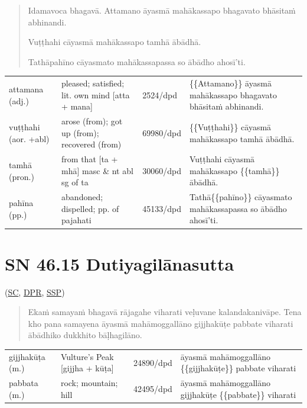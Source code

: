 \documentclass[11pt,oneside]{memoir}
\begin{document}
\clearpage
\casesLegendHeaderBGHere

\begin{quote}
Idamavoca bhagavā. Attamano āyasmā mahākassapo bhagavato bhāsitaṁ abhinandi.

Vuṭṭhahi cāyasmā mahākassapo tamhā ābādhā.

Tathāpahīno cāyasmato mahākassapassa so ābādho ahosī'ti.
\end{quote}

\begin{longtable}{L{\colOne} L{\colTwo} H H}
attamana (adj.) & pleased; satisfied; lit. own mind [atta + mana] & 2524/dpd & \{\{Attamano\}\} āyasmā mahākassapo bhagavato bhāsitaṁ abhinandi.\\[0pt]
vuṭṭhahi (aor. +abl) & arose (from); got up (from); recovered (from) & 69980/dpd & \{\{Vuṭṭhahi\}\} cāyasmā mahākassapo tamhā ābādhā.\\[0pt]
tamhā (pron.) & from that [ta + mhā] masc \& nt abl sg of ta & 30060/dpd & Vuṭṭhahi cāyasmā mahākassapo \{\{tamhā\}\} ābādhā.\\[0pt]
pahīna (pp.) & abandoned; dispelled; pp. of pajahati & 45133/dpd & Tathā\{\{pahīno\}\} cāyasmato mahākassapassa so ābādho ahosī'ti.\\[0pt]
\end{longtable}

\section{SN 46.15 Dutiyagilānasutta}
\label{sec:orgc38f146}

(\href{https://suttacentral.net/sn46.15/pli/ms}{SC}, \href{https://www.digitalpalireader.online/\_dprhtml/index.html?loc=s.4.0.0.1.1.4.m}{DPR}, \href{http://localhost:4848/suttas/sn46.15/pli/ms?window\_type=Sutta+Study}{SSP})

\begin{quote}
Ekaṁ samayaṁ bhagavā rājagahe viharati veḷuvane kalandakanivāpe.
Tena kho pana samayena āyasmā mahāmoggallāno gijjhakūṭe pabbate viharati
ābādhiko dukkhito bāḷhagilāno.
\end{quote}

\begin{longtable}{L{\colOne} L{\colTwo} H H}
gijjhakūṭa (m.) & Vulture's Peak [gijjha + kūṭa] & 24890/dpd & āyasmā mahāmoggallāno \{\{gijjhakūṭe\}\} pabbate viharati\\[0pt]
pabbata (m.) & rock; mountain; hill & 42495/dpd & āyasmā mahāmoggallāno gijjhakūṭe \{\{pabbate\}\} viharati\\[0pt]
\end{longtable}
\end{document}
